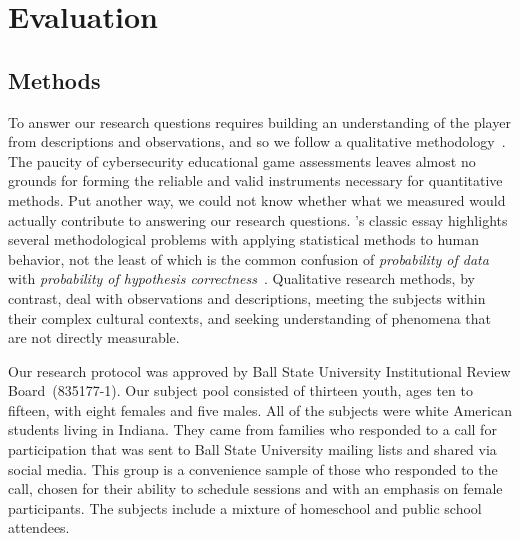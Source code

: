 \documentclass[letterpaper]{article}
\begin{document}
\section{Evaluation}
\label{sec:evaluation}

\subsection{Methods}

To answer our research questions requires building an understanding of
the player from descriptions and observations, and so we follow a
qualitative methodology~\citep[see][for example]{Stake2010}.  The
paucity of cybersecurity educational game assessments leaves almost no
grounds for forming the reliable and valid instruments necessary for
quantitative methods. Put another way, we could not know whether what
we measured would actually contribute to answering our research
questions.  \citeauthor{Cohen1994}'s classic essay highlights several
methodological problems with applying statistical methods to human
behavior, not the least of which is the common confusion of
\textit{probability of data} with \textit{probability of hypothesis
  correctness}~\citep{Cohen1994}.
Qualitative research methods, by contrast, deal with 
observations and descriptions, meeting the subjects within their
complex cultural contexts, and seeking understanding of phenomena
that are not directly measurable. 

Our research protocol was approved by Ball State University
Institutional Review Board~(835177-1). 
Our subject pool consisted of thirteen youth, ages ten to fifteen,
with eight females and five males. All of the subjects were
white American students living in Indiana. 
They came from families who responded to a call for participation that
was sent to Ball State University mailing lists and shared via social
media. This group is a convenience sample of those who responded to the
call, chosen for their ability to schedule sessions and with an emphasis
on female participants. The subjects include a mixture of homeschool
and public school attendees.
\end{document}
